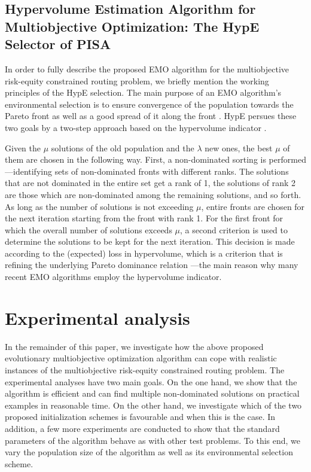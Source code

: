 \documentclass[preprint,12pt]{elsarticle}
\begin{document}
\subsection{Hypervolume Estimation Algorithm for Multiobjective Optimization: The HypE Selector of PISA}
In order to fully describe the proposed EMO algorithm for the multiobjective risk-equity constrained routing problem, we briefly mention the working principles of the HypE selection. The main purpose of an EMO algorithm's environmental selection is to ensure convergence of the population towards the Pareto front as well as a good spread of it along the front \citep{deb2001a}. HypE persues these two goals by a two-step approach based on the hypervolume indicator \citep[see][]{ztlf2003a}.

Given the $\mu$ solutions of the old population and the $\lambda$ new ones, the best $\mu$ of them are chosen in the following way. First, a non-dominated sorting \citep{gold1989a} is performed---identifying sets of non-dominated fronts with different ranks. The solutions that are not dominated in the entire set get a rank of 1, the solutions of rank 2 are those which are non-dominated among the remaining solutions, and so forth. As long as the number of solutions is not exceeding $\mu$, entire fronts are chosen for the next iteration starting from the front with rank 1. For the first front for which the overall number of solutions exceeds $\mu$, a second criterion is used to determine the solutions to be kept for the next iteration. This decision is made according to the (expected) loss in hypervolume, which is a criterion that is refining the underlying Pareto dominance relation \citep{ztb2010a}---the main reason why many recent EMO algorithms employ the hypervolume indicator.


\section{Experimental analysis}\label{sec:experiments}
In the remainder of this paper, we investigate how the above proposed evolutionary multiobjective optimization algorithm can cope with realistic instances of the multiobjective risk-equity constrained routing problem. The experimental analyses have two main goals. On the one hand, we show that the algorithm is efficient and can find multiple non-dominated solutions on practical examples in reasonable time. On the other hand, we investigate which of the two proposed initialization schemes is favourable and when this is the case. In addition, a few more experiments are conducted to show that the standard parameters of the algorithm behave as with other test problems. To this end, we vary the population size of the algorithm as well as its environmental selection scheme.
\end{document}
